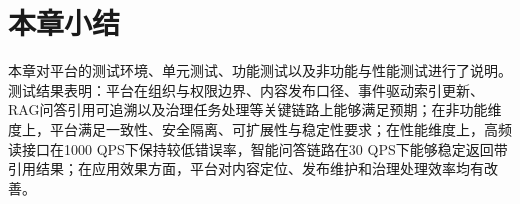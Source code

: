 \section{本章小结}

本章对平台的测试环境、单元测试、功能测试以及非功能与性能测试进行了说明。测试结果表明：平台在组织与权限边界、内容发布口径、事件驱动索引更新、RAG问答引用可追溯以及治理任务处理等关键链路上能够满足预期；在非功能维度上，平台满足一致性、安全隔离、可扩展性与稳定性要求；在性能维度上，高频读接口在1000 QPS下保持较低错误率，智能问答链路在30 QPS下能够稳定返回带引用结果；在应用效果方面，平台对内容定位、发布维护和治理处理效率均有改善。
